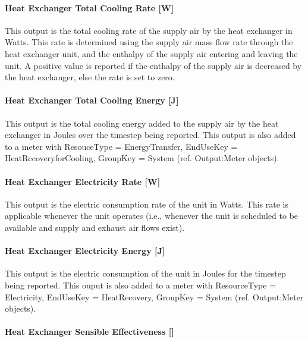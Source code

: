 \paragraph{Heat Exchanger Total Cooling Rate {[}W{]}}\label{heat-exchanger-total-cooling-rate-w-1}

This output is the total cooling rate of the supply air by the heat exchanger in Watts. This rate is determined using the supply air mass flow rate through the heat exchanger unit, and the enthalpy of the supply air entering and leaving the unit. A positive value is reported if the enthalpy of the supply air is decreased by the heat exchanger, else the rate is set to zero.

\paragraph{Heat Exchanger Total Cooling Energy {[}J{]}}\label{heat-exchanger-total-cooling-energy-j-1}

This output is the total cooling energy added to the supply air by the heat exchanger in Joules over the timestep being reported. This output is also added to a meter with ResouceType = EnergyTransfer, EndUseKey = HeatRecoveryforCooling, GroupKey = System (ref. Output:Meter objects).

\paragraph{Heat Exchanger Electricity Rate {[}W{]}}\label{heat-exchanger-electric-power-w-1}

This output is the electric consumption rate of the unit in Watts. This rate is applicable whenever the unit operates (i.e., whenever the unit is scheduled to be available and supply and exhaust air flows exist).

\paragraph{Heat Exchanger Electricity Energy {[}J{]}}\label{heat-exchanger-electric-energy-j-1}

This output is the electric consumption of the unit in Joules for the timestep being reported. This ouput is also added to a meter with ResourceType = Electricity, EndUseKey = HeatRecovery, GroupKey = System (ref. Output:Meter objects).

\paragraph{Heat Exchanger Sensible Effectiveness {[]}}\label{heat-exchanger-sensible-effectiveness}

